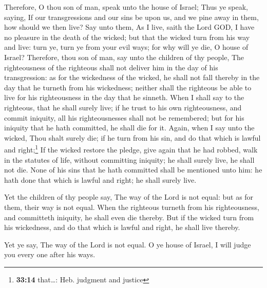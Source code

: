  Therefore, O thou son of man, speak unto the house of
Israel; Thus ye speak, saying, If our transgressions and our sins be
upon us, and we pine away in them, how should we then live?
 Say unto them, As I live, saith the Lord GOD, I have no
pleasure in the death of the wicked; but that the wicked turn from his
way and live: turn ye, turn ye from your evil ways; for why will ye die,
O house of Israel?  Therefore, thou son of man, say unto
the children of thy people, The righteousness of the righteous shall not
deliver him in the day of his transgression: as for the wickedness of
the wicked, he shall not fall thereby in the day that he turneth from
his wickedness; neither shall the righteous be able to live for his
righteousness in the day that he sinneth.  When I shall
say to the righteous, that he shall surely live; if he trust to his own
righteousness, and commit iniquity, all his righteousnesses shall not be
remembered; but for his iniquity that he hath committed, he shall die
for it.  Again, when I say unto the wicked, Thou shalt
surely die; if he turn from his sin, and do that which is lawful and
right;\footnote{\textbf{33:14} that\ldots: Heb. judgment and justice}
 If the wicked restore the pledge, give again that he had
robbed, walk in the statutes of life, without committing iniquity; he
shall surely live, he shall not die.  None of his sins
that he hath committed shall be mentioned unto him: he hath done that
which is lawful and right; he shall surely live.

 Yet the children of thy people say, The way of the Lord
is not equal: but as for them, their way is not equal. 
When the righteous turneth from his righteousness, and committeth
iniquity, he shall even die thereby.  But if the wicked
turn from his wickedness, and do that which is lawful and right, he
shall live thereby.

 Yet ye say, The way of the Lord is not equal. O ye house
of Israel, I will judge you every one after his ways.

